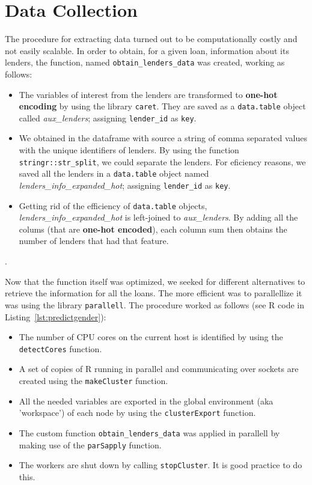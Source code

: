 \section{Data Collection}
The procedure for extracting data turned out to be computationally costly and not easily scalable. In order to obtain, for a given loan, information about its lenders, the function, named \texttt{obtain\_lenders\_data} was created, working as follows:
\begin{itemize}
\item The variables of interest from the lenders are transformed to \textbf{one-hot encoding}   by using the library \texttt{caret}. They are saved as a \texttt{data.table} object called \textit{aux\_lenders}; assigning \texttt{lender\_id} as \texttt{key}.
\item We obtained in the dataframe with source  a string of comma separated values with the unique identifiers of lenders. By using the function \texttt{stringr::str\_split}, we could separate the lenders. For eficiency reasons, we saved all the lenders in a \texttt{data.table} object named \textit{lenders\_info\_expanded\_hot}; assigning \texttt{lender\_id} as \texttt{key}.

\item Getting rid of the efficiency of \texttt{data.table} objects, \textit{lenders\_info\_expanded\_hot} is left-joined to \textit{aux\_lenders}. By adding all the colums (that are \textbf{one-hot encoded}), each column sum then obtains the number of lenders that had that feature.
\end{itemize}.
\par
Now that the function itself was optimized, we seeked for different alternatives to retrieve the information for all the loans. The more efficient was to parallellize it was using the library \texttt{parallell}. The procedure worked as follows (see R code in Listing~\ref{lst:predictgender}):
\begin{itemize}
\item The number of CPU cores on the current host is identified by using the \texttt{detectCores} function.
\item A set of copies of R running in parallel and communicating over sockets are created using the \texttt{makeCluster} function.
\item All the needed variables are exported in the global environment (aka 'workspace') of each node by using the \texttt{clusterExport} function.
\item The custom function \texttt{obtain\_lenders\_data} was applied in parallell by making use of the \texttt{parSapply} function.
\item The workers are shut down by calling \texttt{stopCluster}. It is good practice to do this.
\end{itemize}


